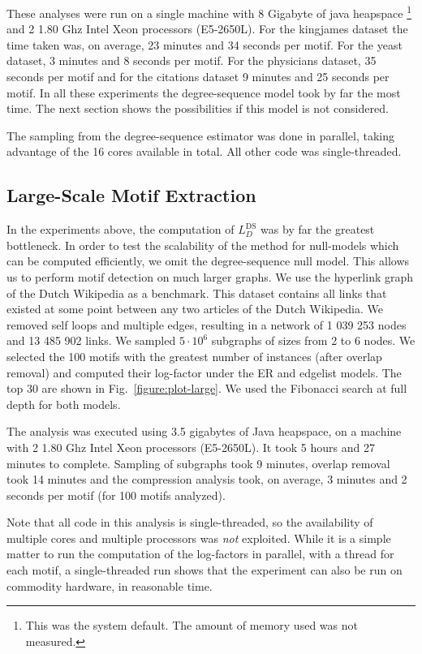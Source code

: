 These analyses were run on a single machine with 8 Gigabyte of java heapspace \footnote{This was the system default. The amount of memory used was not measured.} and 2 1.80 Ghz Intel Xeon processors (E5-2650L). For the kingjames dataset the time taken was, on average, 23 minutes and 34 seconds per motif. For the yeast dataset, 3 minutes and 8 seconds per motif. For the physicians dataset, 35 seconds per motif and for the citations dataset 9 minutes and 25 seconds per motif. In all these experiments the degree-sequence model took by far the most time. The next section shows the possibilities if this model is not considered.
 
The sampling from the degree-sequence estimator was done in parallel, taking advantage of the 16 cores available in total. All other code was single-threaded. 

\subsection*{Large-Scale Motif Extraction}
\label{section:large}

In the experiments above, the computation of $L^\text{DS}_D$ was by far the greatest bottleneck. In order to test the scalability of the method for null-models which can be computed efficiently, we omit the degree-sequence null model. This allows us to perform motif detection on much larger graphs. We use the hyperlink graph of the Dutch Wikipedia \cite{konect:2015:link-dynamic-nlwiki,konect:unlink} as a benchmark. This dataset contains all links that existed at some point between any two articles of the Dutch Wikipedia. We removed self loops and multiple edges, resulting in a network of 1 039 253 nodes and 13 485 902 links.  We sampled $5 \cdot 10^6$ subgraphs of sizes from 2 to 6 nodes. We selected the 100 motifs with the greatest number of instances (after overlap removal) and computed their log-factor under the ER and edgelist models. The top 30 are shown in Fig.~\ref{figure:plot-large}. We used the Fibonacci search at full depth for both models.

The analysis was executed using 3.5 gigabytes of Java heapspace, on a machine with 2 1.80 Ghz Intel Xeon processors (E5-2650L). It took 5 hours and 27 minutes to complete. Sampling of subgraphs took 9 minutes, overlap removal took 14 minutes and the compression analysis took, on average, 3 minutes and 2 seconds per motif (for 100 motifs analyzed).

Note that all code in this analysis is single-threaded, so the availability of multiple cores and multiple processors was \emph{not} exploited. While it is a simple matter to run the computation of the log-factors in parallel, with a thread for each motif, a single-threaded run shows that the experiment can also be run on commodity hardware, in reasonable time.

